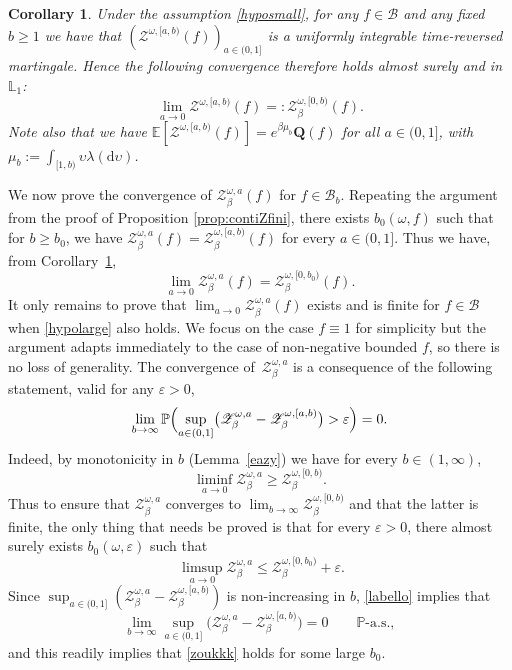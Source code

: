 \documentclass[JEP,XML,SOM,Unicode,published]{cedram}
\let\mathcal\mathscr
\newtheorem{cor}[theorem]{Corollary}
\theoremstyle{definition}
\newcommand{\dd}{\mathrm{d}}
\newcommand{\cB}{{\ensuremath{\mathcal B}} }
\newcommand{\cZ}{{\ensuremath{\mathcal Z}} }
\newcommand{\bQ}{{\ensuremath{\mathbf Q}} }
\newcommand{\bbE}{{\ensuremath{\mathbb E}} }
\newcommand{\bbL}{{\ensuremath{\mathbb L}} }
\newcommand{\bbP}{{\ensuremath{\mathbb P}} }
\let\gb\beta
\let\gep\varepsilon
\let\ups\upsilon
\let\go\omega
\begin{document}
\begin{cor}\label{lem:gene}
Under the assumption \eqref{hyposmall}, for any $f\in \cB$ and any fixed $b\geq 1$ we have that $(\cZ^{\go,[a,b)}(f))_{a\in(0,1]}$ is a uniformly integrable time-reversed martingale.
Hence the following convergence therefore holds almost surely and in $\bbL_1$:
\[
\lim_{a\to 0}\cZ^{\go,[a,b)}(f) =:\cZ^{\go,[0,b)}_\beta(f).
\]
Note also that we have $\bbE[ \cZ^{\go,[a,b)}(f) ] = e^{\gb \mu_b} \bQ(f)$ for all $a\in (0,1]$, with $\mu_b:= \int_{[1,b)} \ups \lambda(\dd \ups)$.
\end{cor}
We now prove the convergence of $\cZ^{\go,a}_\beta(f)$ for $f\in \cB_b$. Repeating the argument from the proof of Proposition \ref{prop:contiZfini}, there exists $b_0(\go,f)$ such that
for $b\ge b_0$, we have $\cZ^{\go,a}_\beta(f)=\cZ^{\go,[a,b)}_\beta(f)$ for every $a\in(0,1]$. Thus we have, from Corollary~\ref{lem:gene},
\begin{equation*}
\lim_{a\to 0}\cZ^{\go,a}_\beta(f)=\cZ^{\go,[0,b_0)}_\beta(f).
\end{equation*}
It only remains to prove that $\lim_{a\to 0}\cZ^{\go,a}_{\beta}(f)$ exists and is finite for $f\in \mathcal B$ when \eqref{hypolarge} also holds. We focus on the case $f\equiv 1$ for simplicity but the argument adapts immediately to the case of non-negative bounded $f$, so there is no loss of generality.
The convergence of~$\cZ^{\go,a}_\beta$ is a consequence of the following statement, valid
for any $\gep>0$,
\begin{equation}\label{labello}
\lim_{b\to \infty} \bbP\Bigl(\sup_{a\in(0,1]}\bigl(\cZ^{\go,a}_\beta - \cZ^{\go,[a,b)}_\beta\bigr) >\gep \Bigr) = 0.
\end{equation}
Indeed, by monotonicity in $b$ (\cf Lemma~\ref{eazy}) we have for every $b\in (1,\infty)$,
\[
\liminf_{a\to 0}\cZ^{\go,a}_\beta \ge
\cZ^{\go,[0,b)}_\beta.
\] Thus to ensure that $\cZ^{\go,a}_\beta$ converges to $\lim_{b\to \infty}\cZ^{\go,[0,b)}_\beta$ and that the latter is finite,
the only thing that needs be proved is that for every $\gep>0$, there almost surely exists $b_0(\go,\gep)$ such that
\begin{equation}\label{zoukkk}
\ \limsup_{a\to 0}\cZ^{\go,a}_\beta \le \cZ^{\go,[0,b_0)}_\beta+\gep.
\end{equation}
Since $\sup_{a\in(0,1]}(\cZ^{\go,a}_\beta - \cZ^{\go,[a,b)}_\beta)$ is non-increasing in $b$,
\eqref{labello} implies that
\begin{equation}
\label{labellobis}
\lim_{b\to\infty} \sup_{a\in(0,1]}\bigl(\cZ^{\go,a}_\beta - \cZ^{\go,[a,b)}_\beta \bigr) =0 \qquad \bbP\text{-a.s.},
\end{equation}
and this readily implies that \eqref{zoukkk} holds for some large $b_0$.
\end{document}
